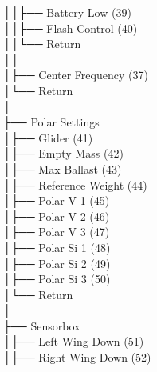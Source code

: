 │\hspace{2em}│\hspace{2em}├── Battery Low (39) \\
│\hspace{2em}│\hspace{2em}├── Flash Control (40) \\
│\hspace{2em}│\hspace{2em}└── Return \\
│\hspace{2em}│\hspace{2em} \\
│\hspace{2em}├── Center Frequency (37) \\
│\hspace{2em}└── Return \\
│\hspace{2em} \\
├── Polar Settings \\
│\hspace{2em}├── Glider (41) \\
│\hspace{2em}├── Empty Mass (42) \\
│\hspace{2em}├── Max Ballast (43) \\
│\hspace{2em}├── Reference Weight (44) \\
│\hspace{2em}├── Polar V 1 (45) \\
│\hspace{2em}├── Polar V 2 (46) \\
│\hspace{2em}├── Polar V 3 (47) \\
│\hspace{2em}├── Polar Si 1 (48) \\
│\hspace{2em}├── Polar Si 2 (49) \\
│\hspace{2em}├── Polar Si 3 (50) \\
│\hspace{2em}└── Return \\
│\hspace{2em} \\
├── Sensorbox \\
│\hspace{2em}├── Left Wing Down (51) \\
│\hspace{2em}├── Right Wing Down (52) \\
